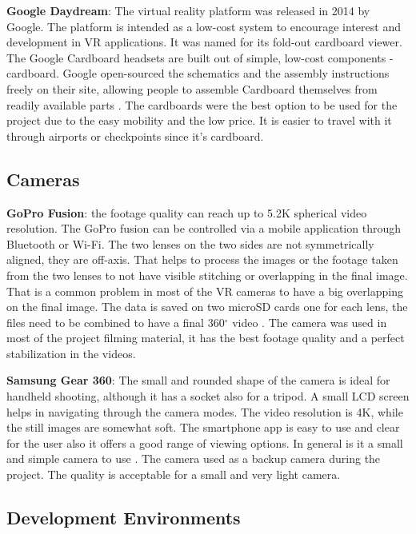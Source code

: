\textbf{Google Daydream}: The virtual reality platform was released in
2014 by Google. The platform is intended as a low-cost system to
encourage interest and development in VR applications. It was
named for its fold-out cardboard viewer. The Google Cardboard
headsets are built out of simple, low-cost components -
cardboard. Google open-sourced the schematics and the
assembly instructions freely on their site, allowing people to
assemble Cardboard themselves from readily available parts \citep{Prasuethsut2014GoogleReview}. The
cardboards were the best option to be used for the project due to the easy mobility and the
low price. It is easier to travel with it through airports or checkpoints since it’s cardboard.



\subsection{Cameras}
\textbf{GoPro Fusion}: the footage quality can reach up to 5.2K spherical video
resolution. The GoPro fusion can be controlled via a mobile
application through Bluetooth or Wi-Fi. The two lenses on the two
sides are not symmetrically aligned, they are off-axis. That helps to
process the images or the footage taken from the two lenses to not
have visible stitching or overlapping in the final image. That is a
common problem in most of the VR cameras to have a big overlapping on the final image. The
data is saved on two microSD cards one for each lens, the files need to be combined to have
a final 360$^{\circ}$ video \citep{Easton2018}. The camera was used in most of the project filming material,
it has the best footage quality and a perfect stabilization in the videos.


\textbf{Samsung Gear 360}: The small and rounded shape of the camera is ideal for
handheld shooting, although it has a socket also for a tripod. A small LCD
screen helps in navigating through the camera modes. The video resolution is
4K, while the still images are somewhat soft. The smartphone app is easy to
use and clear for the user also it offers a good range of viewing options. In
general is it a small and simple camera to use \citep{DigitalCamera2018}. The
camera used as a backup camera during the project. The quality is acceptable
for a small and very light camera.

\subsection{Development Environments}

